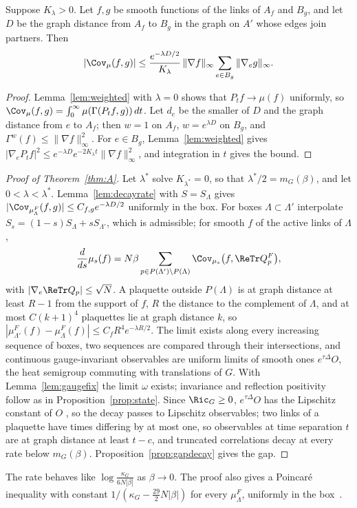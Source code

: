 \begin{lemma}\label{lem:decayrate}
Suppose $K_\lambda>0$. Let $f,g$ be smooth functions of the links of $A_f$ and
$B_g$, and let $D$ be the graph distance from $A_f$ to $B_g$ in the graph on
$A'$ whose edges join partners. Then
\[
|\Cov_\mu(f,g)|\le\frac{e^{-\lambda D/2}}{K_\lambda}\,\|\nabla f\|_\infty
\sum_{e\in B_g}\|\nabla_eg\|_\infty .
\]
\end{lemma}

\begin{proof}
Lemma~\ref{lem:weighted} with $\lambda=0$ shows that $P_tf\to\mu(f)$ uniformly,
so $\Cov_\mu(f,g)=\int_0^\infty\mu(\Gamma(P_tf,g))\,dt$. Let $d_e$ be the smaller of
$D$ and the graph distance from $e$ to $A_f$; then $w=1$ on $A_f$, $w=e^{\lambda
D}$ on $B_g$, and $\Gamma^w(f)\le\|\nabla f\|_\infty^2$. For $e\in B_g$,
Lemma~\ref{lem:weighted} gives $|\nabla_eP_tf|^2\le e^{-\lambda D}e^{-2K_\lambda t}
\|\nabla f\|_\infty^2$, and integration in $t$ gives the bound.
\end{proof}

\begin{proof}[Proof of Theorem~\ref{thm:A}]
Let $\lambda^*$ solve $K_{\lambda^*}=0$, so that $\lambda^*/2=m_G(\beta)$, and let
$0<\lambda<\lambda^*$. Lemma~\ref{lem:decayrate} with $S=S_\Lambda$ gives
$|\Cov_{\mu^F_\Lambda}(f,g)|\le C_{f,g}e^{-\lambda D/2}$ uniformly in the box. For
boxes $\Lambda\subset\Lambda'$ interpolate $S_s=(1-s)S_\Lambda+sS_{\Lambda'}$, which is
admissible; for smooth $f$ of the active links of $\Lambda$,
\[
\frac d{ds}\mu_s(f)=N\beta\sum_{p\in P(\Lambda')\setminus P(\Lambda)}\Cov_{\mu_s}
\bigl(f,\ReTr Q^F_p\bigr),
\]
with $|\nabla_e\ReTr Q_p|\le\sqrt N$. A plaquette outside $P(\Lambda)$ is at graph
distance at least $R-1$ from the support of $f$, $R$ the distance to the
complement of $\Lambda$, and at most $C(k+1)^4$ plaquettes lie at graph distance
$k$, so $|\mu^F_{\Lambda'}(f)-\mu^F_\Lambda(f)|\le C_fR^4e^{-\lambda R/2}$. The limit
exists along every increasing sequence of boxes, two sequences are compared
through their intersections, and continuous gauge-invariant observables are
uniform limits of smooth ones $e^{\tau\Delta}O$, the heat semigroup commuting
with translations of $G$. With Lemma~\ref{lem:gaugefix} the limit $\omega$ exists;
invariance and reflection positivity follow as in Proposition~\ref{prop:state}.
Since $\Ric_G\ge0$, $e^{\tau\Delta}O$ has the Lipschitz constant of $O$
\cite[Sect.~3.3]{BGL14}, so the decay passes to Lipschitz observables; two links
of a plaquette have times differing by at most one, so observables at time
separation $t$ are at graph distance at least $t-c$, and truncated
correlations decay at every rate below $m_G(\beta)$. Proposition~\ref{prop:gapdecay}
gives the gap.
\end{proof}

The rate behaves like $\log\frac{\kappa_G}{6N|\beta|}$ as $\beta\to0$. The proof
also gives a Poincar\'e inequality with constant $1/(\kappa_G-\frac{29}2N|\beta|)$
for every $\mu^F_\Lambda$, uniformly in the box~\cite[Cor.~5.7.2]{BGL14}.
